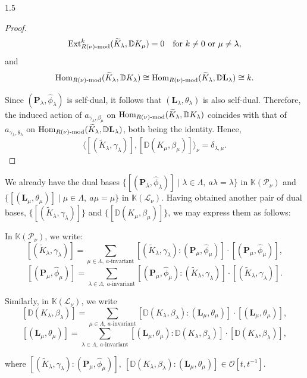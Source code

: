 \documentclass[10pt]{amsart}
\def\Hom{\mbox{\rm Hom}}  \def\ap{\mbox{\rm ap}}
\def\Ext{\mbox{\rm Ext}}   \def\Ker{\mbox{\rm Ker}\,}
\begin{document}
\begin{spacing}{1.5}
\begin{proof}
\[
    \Ext^k_{R(\nu)\text{-mod}}(\widetilde{K}_{\lambda}, \mathbb{D}K_{\mu}) = 0 \quad \text{for } k \neq 0 \text{ or } \mu \neq \lambda,
\]
and
\[
    \Hom_{R(\nu)\text{-mod}}(\widetilde{K}_{\lambda}, \mathbb{D}K_{\lambda}) \cong \Hom_{R(\nu)\text{-mod}}(\widetilde{K}_{\lambda}, \mathbb{D}\mathbf{L}_{\lambda}) \cong k.
\]

Since $(\mathbf{P}_{\lambda}, \hat{\phi}_{\lambda})$ is self-dual, it follows that $(\mathbf{L}_{\lambda}, \theta_{\lambda})$ is also self-dual. Therefore, the induced action of $a_{\gamma_{\lambda}, \beta_{\mu}}$ on $\Hom_{R(\nu)\text{-mod}}(\widetilde{K}_{\lambda}, \mathbb{D}K_{\lambda})$ coincides with that of $a_{\gamma_{\lambda}, \theta_{\lambda}}$ on $\Hom_{R(\nu)\text{-mod}}(\widetilde{K}_{\lambda}, \mathbb{D}\mathbf{L}_{\lambda})$, both being the identity. Hence,
\[
    \langle [(\widetilde{K}_{\lambda}, \gamma_{\lambda})], [\mathbb{D}(K_{\mu}, \beta_{\mu})] \rangle_{\nu} = \delta_{\lambda, \mu}.
\]
\end{proof}
We already have the dual bases $\{[(\mathbf{P}_{\lambda}, \hat{\phi}_{\lambda})] \mid \lambda \in \Lambda,\ a\lambda=\lambda \}$ in $\mathbb{K}(\mathcal{P}_{\nu})$ and $\{[(\mathbf{L}_{\mu}, \theta_{\mu})] \mid \mu \in \Lambda,\ a\mu=\mu \}$ in $\mathbb{K}(\mathcal{L}_{\nu})$. Having obtained another pair of dual bases, $\{[(\widetilde{K}_{\lambda}, \gamma_{\lambda})]\}$ and $\{[\mathbb{D}(K_{\mu}, \beta_{\mu})]\}$, we may express them as follows:

In $\mathbb{K}(\mathcal{P}_{\nu})$, we write:
\[
[(\widetilde{K}_{\lambda}, \gamma_{\lambda})] = \sum_{\mu \in \Lambda,\ a\text{-invariant}} [(\widetilde{K}_{\lambda}, \gamma_{\lambda}):(\mathbf{P}_{\mu}, \hat{\phi}_{\mu})] \cdot [(\mathbf{P}_{\mu}, \hat{\phi}_{\mu})],
\]
\[
[(\mathbf{P}_{\mu}, \hat{\phi}_{\mu})] = \sum_{\lambda \in \Lambda,\ a\text{-invariant}} [(\mathbf{P}_{\mu}, \hat{\phi}_{\mu}):(\widetilde{K}_{\lambda}, \gamma_{\lambda})] \cdot [(\widetilde{K}_{\lambda}, \gamma_{\lambda})].
\]

Similarly, in $\mathbb{K}(\mathcal{L}_{\nu})$, we write
\[
[\mathbb{D}(K_{\lambda}, \beta_{\lambda})] = \sum_{\mu \in \Lambda,\ a\text{-invariant}} [\mathbb{D}(K_{\lambda}, \beta_{\lambda}):(\mathbf{L}_{\mu}, \theta_{\mu})] \cdot [(\mathbf{L}_{\mu}, \theta_{\mu})],
\]
\[
[(\mathbf{L}_{\mu}, \theta_{\mu})] = \sum_{\lambda \in \Lambda,\ a\text{-invariant}} [(\mathbf{L}_{\mu}, \theta_{\mu}):\mathbb{D}(K_{\lambda}, \beta_{\lambda})] \cdot [\mathbb{D}(K_{\lambda}, \beta_{\lambda})],
\]

where $[(\widetilde{K}_{\lambda}, \gamma_{\lambda}):(\mathbf{P}_{\mu}, \hat{\phi}_{\mu})],\ [\mathbb{D}(K_{\lambda}, \beta_{\lambda}):(\mathbf{L}_{\mu}, \theta_{\mu})] \in \mathcal{O}[t, t^{-1}]$.


\end{spacing}
\end{document}

